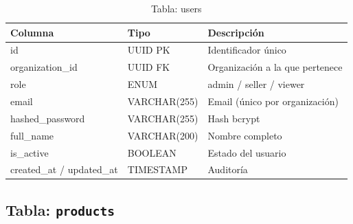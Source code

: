\begin{longtable}[]{@{}
  >{\raggedright\arraybackslash}p{}
  >{\raggedright\arraybackslash}p{}
  >{\raggedright\arraybackslash}p{}@{}}
\caption[Tabla: users]{Tabla: users}\tabularnewline
\toprule\noalign{}
\begin{minipage}[b]{\linewidth}\raggedright
Columna
\end{minipage} & \begin{minipage}[b]{\linewidth}\raggedright
Tipo
\end{minipage} & \begin{minipage}[b]{\linewidth}\raggedright
Descripción
\end{minipage} \\
\midrule\noalign{}
\endhead
\bottomrule\noalign{}
\endlastfoot
id & UUID PK & Identificador único \\
organization\_id & UUID FK & Organización a la que pertenece \\
role & ENUM & admin / seller / viewer \\
email & VARCHAR(255) & Email (único por organización) \\
hashed\_password & VARCHAR(255) & Hash bcrypt \\
full\_name & VARCHAR(200) & Nombre completo \\
is\_active & BOOLEAN & Estado del usuario \\
created\_at / updated\_at & TIMESTAMP & Auditoría \\
\end{longtable}

\subsection{\texorpdfstring{Tabla: \texttt{products}}{Tabla: products}}\label{tabla-products}

